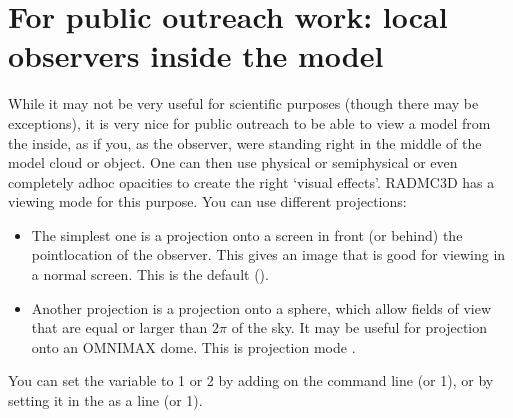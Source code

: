 \documentclass[letterpaper,10pt,english]{sphinxmanual}
\begin{document}
\section{For public outreach work: local observers inside the model}
\label{\detokenize{imagesspectra:for-public-outreach-work-local-observers-inside-the-model}}\label{\detokenize{imagesspectra:sec-local-observer}}
While it may not be very useful for scientific purposes (though there may be
exceptions), it is very nice for public outreach to be able to view a model
from the inside, as if you, as the observer, were standing right in the
middle of the model cloud or object. One can then use physical or
semi\sphinxhyphen{}physical or even completely ad\sphinxhyphen{}hoc opacities to create the right
‘visual effects’. RADMC\sphinxhyphen{}3D has a viewing mode for this purpose. You can use
different projections:
\begin{itemize}
\item {} 

The simplest one is a projection onto a screen in front (or behind) the
point\sphinxhyphen{}location of the observer. This gives an image that is good for viewing
in a normal screen. This is the default ().

\item {} 

Another projection is a projection onto a sphere, which allow fields of view
that are equal or larger than \(2\pi\) of the sky. It may be useful for
projection onto an OMNIMAX dome. This is projection mode
.

\end{itemize}

You can set the variable  to 1 or 2 by adding on
the command line  (or 1), or by setting it in the
 as a line  (or 1).
\end{document}
